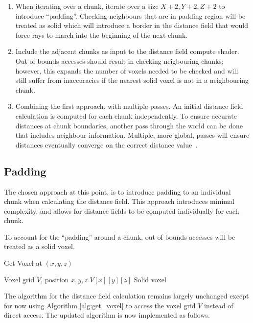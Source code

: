 \begin{enumerate}
    \item When iterating over a chunk, iterate over a size \(X + 2, Y + 2, Z + 2\) to introduce ``padding''. Checking
          neighbours that are in padding region will be treated as solid which will introduce a border in the distance field
          that would force rays to march into the beginning of the next chunk.
    \item Include the adjacent chunks as input to the distance field compute shader. Out-of-bounds accesses should
          result in checking neigbouring chunks; however, this expands the number of voxels needed to be checked and will
          still suffer from inaccuracies if the nearest solid voxel is not in a neighbouring chunk.
    \item Combining the first approach, with multiple passes. An initial distance field calculation is computed for each
          chunk independently. To ensure accurate distances at chunk boundaries, another pass through the world can be done
          that includes neighbour information. Multiple, more global, passes will ensure distances eventually converge on the
          correct distance value~\cite{gorobets2023approach,sinharoy1993finding,xu2015fast}.
\end{enumerate}

\subsection{Padding}
The chosen approach at this point, is to introduce padding to an individual chunk when calculating the distance field.
This approach introduces minimal complexity, and allows for distance fields to be computed individually for each chunk.

To account for the ``padding'' around a chunk, out-of-bounds accesses will be treated as a solid voxel.

\begin{algorithm}[H]
    \caption{Get Voxel at \((x, y, z)\)}
    \label{alg:get_voxel}
    \begin{algorithmic}[1]
        \REQUIRE Voxel grid \(V\), position \(x, y, z\)
        \RETURN \(V[x][y][z]\)
        \ELSE
        \RETURN Solid voxel
        \ENDIF
    \end{algorithmic}
\end{algorithm}

The algorithm for the distance field calculation remains largely unchanged except for now using Algorithm
\ref{alg:get_voxel} to access the voxel grid \(V\) instead of direct access. The updated algorithm is now implemented
as follows.

